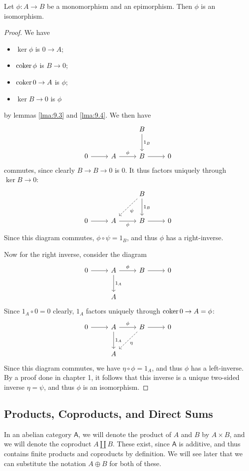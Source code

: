 \begin{lemma}\label{lma:9.5}
	Let $\phi : A \to B$ be a monomorphism and an epimorphism. Then $\phi $ is an isomorphism.
\end{lemma}
\begin{proof}
	We have
	\begin{itemize}
		\item $\ker \phi $ is $0\to A$;
		\item $\operatorname{coker} \phi $ is $B\to 0$;
		\item $\operatorname{coker}  0\to A$ is $\phi $;
		\item $\ker B\to 0$ is $\phi $
	\end{itemize}
	by lemmas \ref{lma:9.3} and \ref{lma:9.4}. We then have
	\[\begin{tikzcd}[row sep = 2.5em, column sep = 2.5em]
		&&B\arrow[d, "1_B"]\\
		0\arrow[r]&A\arrow[r, "\phi "]&B\arrow[r]&0
	\end{tikzcd}\]
	commutes, since clearly $B\to B\to 0$ is $0$. It thus factors uniquely through $\ker B\to 0$:
	\[\begin{tikzcd}[row sep = 2.5em, column sep = 2.5em]
		&&B\arrow[d, "1_B"]\arrow[dl, dashed, "\psi "]\\
		0\arrow[r]&A\arrow[r, "\phi "']&B\arrow[r]&0
	\end{tikzcd}\]
	Since this diagram commutes, $\phi \circ \psi =1_B$, and thus $\phi $ has a right-inverse.

	Now for the right inverse, consider the diagram
	\[\begin{tikzcd}[row sep = 2.5em, column sep = 2.5em]
		0\arrow[r]&A\arrow[d, "1_A"]\arrow[r, "\phi"]&B\arrow[r]&0\\
			  &A
	\end{tikzcd}\]
	Since $1_A \circ 0=0$ clearly, $1_A$ factors uniquely through $\operatorname{coker} 0\to A=\phi $:
	\[\begin{tikzcd}[row sep = 2.5em, column sep = 2.5em]
		0\arrow[r]&A\arrow[d, "1_A"]\arrow[r, "\phi "]&\arrow[dl, dashed, "\eta  "]B\arrow[r]&0\\
			  &A
	\end{tikzcd}\]
	Since this diagram commutes, we have $\eta  \circ \phi =1_A$, and thus $\phi $ has a left-inverse. By a proof done in chapter 1, it follows that this inverse is a unique two-sided inverse $\eta =\psi $, and thus $\phi $ is an isomorphism.
\end{proof}

\subsection{Products, Coproducts, and Direct Sums}
In an abelian category $\mathsf{A} $, we will denote the product of $A$ and $B$ by $A\times B$, and we will denote the coproduct $A\amalg B$. These exist, since $\mathsf{A} $ is additive, and thus contains finite products and coproducts by definition. We will see later that we can substitute the notation $A\oplus B$ for both of these.

